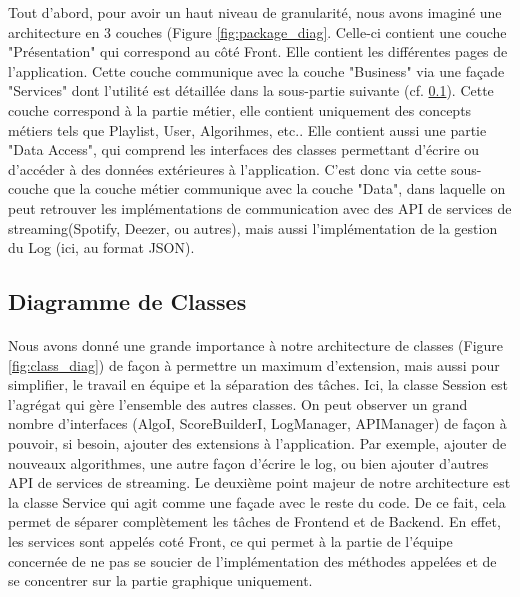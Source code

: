 \documentclass{article}
\begin{document}
		Tout d'abord, pour avoir un haut niveau de granularité, nous avons imaginé une architecture en 3 couches (Figure \ref{fig:package_diag}. Celle-ci contient une couche "Présentation" qui correspond au côté Front. Elle contient les différentes pages de l'application. Cette couche communique avec la couche "Business" via une façade "Services" dont l'utilité est détaillée dans la sous-partie suivante (cf. \ref{class_diag}). Cette couche correspond à la partie métier, elle contient uniquement des concepts métiers tels que Playlist, User, Algorihmes, etc.. Elle contient aussi une partie "Data Access", qui comprend les interfaces des classes permettant d'écrire ou d'accéder à des données extérieures à l'application. C'est donc via cette sous-couche que la couche métier communique avec la couche "Data", dans laquelle on peut retrouver les implémentations de communication avec des API de services de streaming(Spotify, Deezer, ou autres), mais aussi l'implémentation de la gestion du Log (ici, au format JSON).
		\subsection{Diagramme de Classes}\label{class_diag}
		\paragraph{}
		Nous avons donné une grande importance à notre architecture de classes (Figure \ref{fig:class_diag}) de façon à permettre un maximum d'extension, mais aussi pour simplifier, le travail en équipe et la séparation des tâches. Ici, la classe Session est l'agrégat qui gère l'ensemble des autres classes. On peut observer un grand nombre d'interfaces (AlgoI, ScoreBuilderI, LogManager, APIManager) de façon à pouvoir, si besoin, ajouter des extensions à l'application. Par exemple, ajouter de nouveaux algorithmes, une autre façon d'écrire le log, ou  bien ajouter d'autres API de services de streaming. Le deuxième point majeur de notre architecture est la classe Service qui agit comme une façade avec le reste du code. De ce fait, cela permet de séparer complètement les tâches de Frontend et de Backend. En effet, les services sont appelés coté Front, ce qui permet à la partie de l'équipe concernée de ne pas se soucier de l'implémentation des méthodes appelées et de se concentrer sur la partie graphique uniquement.
		
\end{document}
